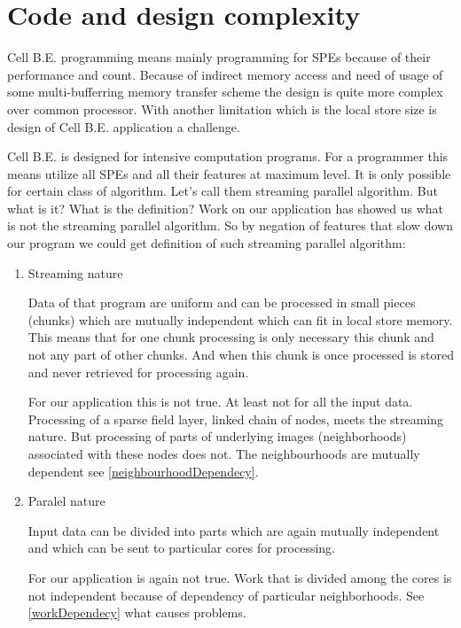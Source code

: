 \section{Code and design complexity}

\par
Cell B.E. programming means mainly programming for SPEs because of their performance and count.
Because of indirect memory access and need of usage of some multi-bufferring memory transfer scheme the design is quite more complex over common processor.
With another limitation which is the local store size is design of Cell B.E. application a challenge.

\par
Cell B.E. is designed for intensive computation programs.
For a programmer this means utilize all SPEs and all their features at maximum level.
It is only possible for certain class of algorithm.
Let's call them streaming parallel algorithm.
But what is it? What is the definition?
Work on our application has showed us what is not the streaming parallel algorithm.
So by negation of features that slow down our program we could get definition of such streaming parallel algorithm:
\begin{enumerate}

\item{Streaming nature}
\par
Data of that program are uniform and can be processed in small pieces (chunks) which are mutually independent which can fit in local store memory.
This means that for one chunk processing is only necessary this chunk and not any part of other chunks.
And when this chunk is once processed is stored and never retrieved for processing again.

\par
For our application this is not true.
At least not for all the input data.
Processing of a sparse field layer, linked chain of nodes, meets the streaming nature.
But processing of parts of underlying images (neighborhoods) associated with these nodes does not.
The neighbourhoods are mutually dependent see \ref{neighbourhoodDependecy}.

\item{Paralel nature}
\par
Input data can be divided into parts which are again mutually independent and which can be sent to particular cores for processing.

\par
For our application is again not true.
Work that is divided among the cores is not independent because of dependency of particular neighborhoods.
See \ref{workDependecy} what causes problems.

\end{enumerate}


